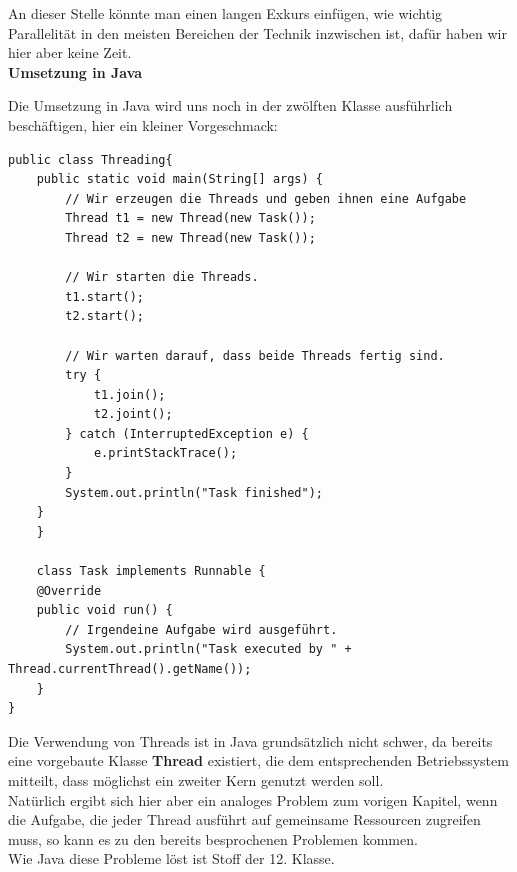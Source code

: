 \documentclass{article}
\begin{document}
An dieser Stelle könnte man einen langen Exkurs einfügen, wie wichtig Parallelität in den meisten Bereichen der Technik inzwischen ist, dafür haben wir hier aber keine Zeit. \vspace{5mm} \\

\textbf{Umsetzung in Java}

Die Umsetzung in Java wird uns noch in der zwölften Klasse ausführlich beschäftigen, hier ein kleiner Vorgeschmack: 
\begin{verbatim}
public class Threading{
    public static void main(String[] args) {
        // Wir erzeugen die Threads und geben ihnen eine Aufgabe
        Thread t1 = new Thread(new Task());
        Thread t2 = new Thread(new Task());
        
        // Wir starten die Threads.
        t1.start();
        t2.start();
        
        // Wir warten darauf, dass beide Threads fertig sind.
        try {
            t1.join();
            t2.joint();
        } catch (InterruptedException e) {
            e.printStackTrace();
        }
        System.out.println("Task finished");
    }
    }

    class Task implements Runnable {
    @Override
    public void run() {
        // Irgendeine Aufgabe wird ausgeführt. 
        System.out.println("Task executed by " + Thread.currentThread().getName());
    }
}
\end{verbatim}
Die Verwendung von Threads ist in Java grundsätzlich nicht schwer, da bereits eine vorgebaute Klasse \textbf{Thread} existiert, die dem entsprechenden Betriebssystem mitteilt, dass möglichst ein zweiter Kern genutzt werden soll. \\
Natürlich ergibt sich hier aber ein analoges Problem zum vorigen Kapitel, wenn die Aufgabe, die jeder Thread ausführt auf gemeinsame Ressourcen zugreifen muss, so kann es zu den bereits besprochenen Problemen kommen. \\
Wie Java diese Probleme löst ist Stoff der 12. Klasse. 
\end{document}
